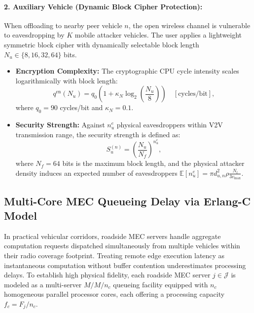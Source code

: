 \documentclass[12pt,a4paper]{article}
\begin{document}
\paragraph{2. Auxiliary Vehicle (Dynamic Block Cipher Protection):}
When offloading to nearby peer vehicle $n$, the open wireless channel is vulnerable to eavesdropping by $K$ mobile attacker vehicles. The user applies a lightweight symmetric block cipher with dynamically selectable block length $N_u \in \{8, 16, 32, 64\}$ bits.
\begin{itemize}
    \item \textbf{Encryption Complexity:} The cryptographic CPU cycle intensity scales logarithmically with block length:
    \begin{equation}
    q^{\mathrm{en}}(N_u) = q_0 \left( 1 + \kappa_N \log_2\left( \frac{N_u}{8} \right) \right) \quad [\text{cycles/bit}],
    \label{eq:block_cipher_cycles}
    \end{equation}
    where $q_0 = 90$ cycles/bit and $\kappa_N = 0.1$.
    \item \textbf{Security Strength:} Against $n_u^e$ physical eavesdroppers within V2V transmission range, the security strength is defined as:
    \begin{equation}
    S_u^{(n)} = \left( \frac{N_u}{N_f} \right)^{n_u^e},
    \label{eq:security_strength}
    \end{equation}
    where $N_f = 64$ bits is the maximum block length, and the physical attacker density induces an expected number of eavesdroppers $\mathbb{E}[n_u^e] = \pi d_{u,n}^2 \rho \frac{N_l}{3 v_{\max}}$.
\end{itemize}

\subsection{Multi-Core MEC Queueing Delay via Erlang-C Model}
\label{subsec:erlang_c_queueing}
In practical vehicular corridors, roadside MEC servers handle aggregate computation requests dispatched simultaneously from multiple vehicles within their radio coverage footprint. Treating remote edge execution latency as instantaneous computation without buffer contention underestimates processing delays. To establish high physical fidelity, each roadside MEC server $j \in \mathcal{J}$ is modeled as a multi-server $M/M/n_c$ queueing facility equipped with $n_c$ homogeneous parallel processor cores, each offering a processing capacity $f_c = F_j / n_c$.
\end{document}
